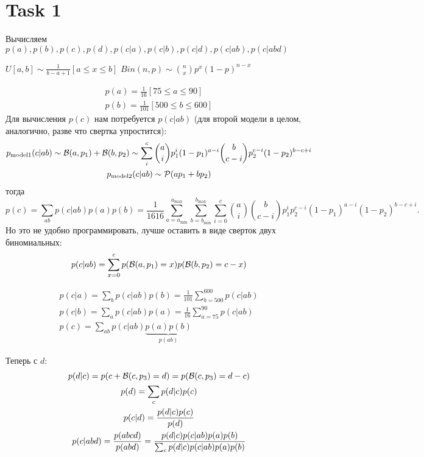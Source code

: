 \section{Task 1}

\begin{task}
    Вычисляем $p(a), p(b), p(c), p(d), p(c|a), p(c|b), p(c|d), p(c|ab), p(c|abd)$
\end{task}

\begin{solution}
    \begin{remark}
        $U[a,b] \sim \frac{1}{b - a + 1}[a \le x \le b]$
        $Bin(n, p) \sim {n \choose x} p^x (1 - p)^{n - x}$
    \end{remark}

    \begin{gather}
        p(a) = \frac{1}{16}[75 \le a \le 90] \\
        p(b) = \frac{1}{101}[500 \le b \le 600]
    \end{gather}
    Для вычисления $p(c)$ нам потребуется $p(c|ab)$ (для второй модели в целом, аналогично, разве что свертка упростится):
    \begin{gather}
        p_{\text{model}1}(c|ab) \sim \mathcal{B}(a, p_1) + \mathcal{B}(b, p_2) \sim \sum_i^c {a \choose i} p_1^i (1 - p_1)^{a - i} {b \choose c - i} p_2^{c - i} (1 - p_2)^{b - c + i} \\
        p_{\text{model}2}(c|ab) \sim \mathcal{P}(ap_1 + bp_2)
    \end{gather}
    тогда
    \begin{equation}
        p(c) = \sum_{ab} p(c|ab)p(a)p(b) = \frac{1}{1616} \sum_{a = a_{\min}}^{a_{\max}} \sum_{b = b_{\min}}^{b_{\max}} \sum_{i = 0}^c {a \choose i} {b \choose c - i} p_1^i p_2^{c - i} (1 - p_1)^{a - i} (1 - p_2)^{b - c + i}.
    \end{equation}
    Но это не удобно программировать, лучше оставить в виде сверток двух биномиальных:
    \begin{equation}
        p(c|ab) = \sum_{x = 0}^c p(\mathcal{B}(a, p_1) = x) p(\mathcal{B}(b, p_2) = c - x)
    \end{equation}

    \begin{gather}
        p(c|a) = \sum_b p(c|ab)p(b) = \frac{1}{101} \sum_{b = 500}^{600} p(c|ab) \\
        p(c|b) = \sum_a p(c|ab)p(a) = \frac{1}{16} \sum_{a = 75}^{90} p(c|ab) \\
        p(c) = \sum_{ab} p(c|ab) \underbrace{p(a)p(b)}_{p(ab)}
    \end{gather}

    Теперь с $d$:
    \begin{gather}
        p(d|c) = p(c + \mathcal{B}(c, p_3) = d) = p(\mathcal{B}(c, p_3) = d - c) \\
        p(d) = \sum_c p(d|c)p(c) \\
        p(c|d) = \frac{p(d|c) p(c)}{p(d)} \\
        p(c|abd) = \frac{p(abcd)}{p(abd)} = \frac{p(d|c) p(c|ab) p(a) p(b)}{\sum_c p(d|c) p(c|ab) p(a) p(b)}
    \end{gather}
\end{solution}
